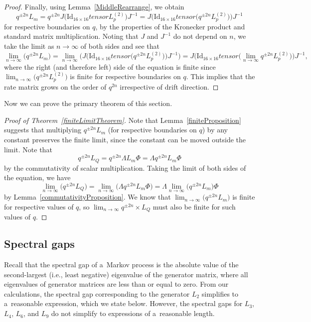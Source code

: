 \documentclass[10pt,a4paper]{amsart}
\numberwithin{equation}{section}
\theoremstyle{definition}
\def\mathcal#1{#1}
\def\otimes{ tensor }
\begin{document}
\begin{proof}
Finally, using Lemma~\ref{MiddleRearrange}, we obtain
\[q^{\pm 2n} L_m = q^{\pm 2n}J\bigl(\textrm{Id}_{16 \times 16} \otimes L^{(2)}_p\bigr)J^{-1} = J\bigl(\textrm{Id}_{16 \times 16} \otimes \bigl(q^{\pm 2n} L^{(2)}_p\bigr)\bigr)J^{-1}\] for respective boundaries on $q$, by the properties of the Kronecker product and standard matrix multiplication. Noting that $J$ and $J^{-1}$ do not depend on $n$, we take the limit as $n \to \infty$ of both sides and see that \[\lim_{n \to \infty} \bigl(q^{\pm 2n} L_m\bigr) = \lim_{n \to \infty} \bigl(J\bigl(\textrm{Id}_{16 \times 16} \otimes \bigl(q^{\pm 2n} L^{(2)}_p\bigr)\bigr)J^{-1}\bigr) = J\bigl(\textrm{Id}_{16 \times 16} \otimes \bigl(\lim_{n \to \infty} q^{\pm 2n} L^{(2)}_p\bigr)\bigr)J^{-1},\] where the right (and therefore left) side of the equation is finite since $\lim_{n \to \infty} \bigl(q^{\pm 2n} L^{(2)}_p\bigr)$ is finite for respective boundaries on $q$. This implies that the rate matrix grows on the order of $q^{2n}$ irrespective of drift direction.
\end{proof}

Now we can prove the primary theorem of this section.

\begin{proof}[Proof of Theorem~\ref{finiteLimitTheorem}]
\label{finite_theorem_proof}
Note that Lemma~\ref{finiteProposition} suggests that multiplying $q^{\pm 2n} L_m$ (for respective boundaries on $q$) by any constant preserves the finite limit, since the constant can be moved outside the limit. Note that
\[
q^{\pm 2n} L_Q = q^{\pm 2n} \Lambda L_m \Phi = \Lambda q^{\pm 2n} L_m \Phi
\]
 by the commutativity of scalar multiplication. Taking the limit of both sides of the equation, we have
\[
\lim_{n \to \infty} \bigl(q^{\pm 2n} L_Q\bigr) = \lim_{n \to \infty} \bigl(\Lambda q^{\pm 2n} L_m \Phi\bigr) = \Lambda \lim_{n \to \infty} \bigl(q^{\pm 2n} L_m\bigr) \Phi
\]
 by Lemma~\ref{commutativityProposition}. We know that $\lim_{n \to \infty} \bigl(q^{\pm 2n} \!L_m\bigr)$ is finite for respective values of $q$, so $\lim_{n \to \infty}\! q^{\pm 2n}\allowbreak\times L_Q$ must also be finite for such values of $q$.
\end{proof}

\subsection{Spectral gaps}

Recall that the spectral gap of a~Markov process is the absolute value of the second-largest (i.e., least negative) eigenvalue of the generator matrix, where all eigenvalues of generator matrices are less than or equal to zero. From our calculations, the spectral gap corresponding to the generator $\mathcal{L}_2$ simplifies to a~reasonable expression, which we state below. However, the spectral gaps for $\mathcal{L}_3$, $\mathcal{L}_4$, $\mathcal{L}_6$, and $\mathcal{L}_9$ do not simplify to expressions of a~reasonable length.
\end{document}
